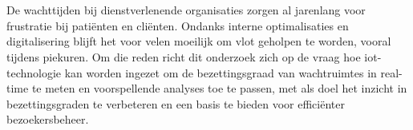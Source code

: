 
%
%
%
%
%

%



\chapter*{}
De wachttijden bij dienstverlenende organisaties zorgen al jarenlang voor frustratie bij patiënten en cliënten. Ondanks interne optimalisaties en digitalisering blijft het voor velen moeilijk om vlot geholpen te worden, vooral tijdens piekuren. Om die reden richt dit onderzoek zich op de vraag hoe \gls{iot}-technologie kan worden ingezet om de bezettingsgraad van wachtruimtes in real-time te meten en voorspellende analyses toe te passen, met als doel het inzicht in bezettingsgraden te verbeteren en een basis te bieden voor efficiënter bezoekersbeheer. \\

